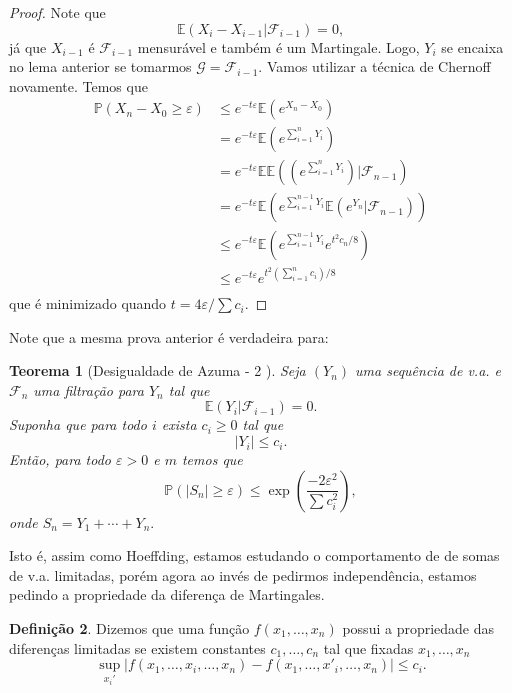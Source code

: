 \documentclass[12pt,a4paper,oneside]{book}
\newtheorem{theorem}{Teorema}[section]
\theoremstyle{definition}
\newtheorem{definition}[theorem]{Defini\c{c}\~ao}
\theoremstyle{remark}
\numberwithin{equation}{section}
\newcommand{\e}{\varepsilon}
\newcommand{\E}{\mathbb{E}}
\newcommand{\pr}{\mathbb{P}}
\newcommand{\ds}{\displaystyle}
\begin{document}
\begin{proof}
Note que 
$$\E(X_i-X_{i-1}|\mathcal{F}_{i-1}) = 0, $$ já que $X_{i-1}$ é $\mathcal{F}_{i-1}$ mensurável e também é um Martingale. Logo, $Y_i$ se encaixa no lema anterior se tomarmos $\mathcal{G} =\mathcal{F}_{i-1}. $
Vamos utilizar a técnica de Chernoff novamente. Temos que
\begin{align*}
\pr(X_n-X_0\geq \e) &\leq e^{-t\e}\E(e^{X_n-X_0})\\
 &= e^{-t\e}\E(e^{\sum_{i=1}^n Y_i})\\
 &=e^{-t\e}\E\E((e^{\sum_{i=1}^n Y_i})|\mathcal{F}_{n-1})\\
  &=e^{-t\e}\E( e^{\sum_{i=1}^{n-1} Y_i}\E(e^{Y_n}|\mathcal{F}_{n-1}))\\
  &\leq e^{-t\e}\E( e^{\sum_{i=1}^{n-1} Y_i}e^{t^2 c_n/8
  })\\
 &\leq e^{-t\e} e^{t^2 (\sum_{i=1}^{n}c_i)/8}\\
\end{align*}
que é minimizado quando $t=4\e/\sum c_i.$

\end{proof}
\begin{tcolorbox}
Note que a mesma prova anterior é verdadeira para:
\begin{theorem}[Desigualdade de Azuma - 2 ]Seja $(Y_n)$ uma sequência de v.a. e $\mathcal{F}_n$ uma filtração para $Y_n$  tal que 
$$\E(Y_i|\mathcal{F}_{i-1})=0.$$
Suponha que para todo $i$ exista $c_i\geq 0$ tal que
$$|Y_i|\leq c_i. $$
Então, para todo $\e>0$ e $m$ temos que
$$\pr\left(\ds |S_n| \geq \e \right) \leq \exp \left(\dfrac{-2\e^2}{\sum c_i^2} \right),  $$
onde 
$S_n = Y_1+\cdots+Y_n. $ 
\end{theorem}

Isto é, assim como Hoeffding, estamos estudando o comportamento de de somas de v.a. limitadas, porém agora ao invés de pedirmos independência, estamos pedindo a propriedade da diferença de Martingales.

\end{tcolorbox}




\begin{definition}\label{def-diferencaslimitadas}
Dizemos que uma função $f(x_1,\dots,x_n)$ possui a propriedade das diferenças limitadas se existem constantes $c_1,\dots,c_n$ tal que fixadas $x_1,\dots,x_n$
$$\sup_{x_i'} |f(x_1,\dots,x_i,\dots,x_n) -f(x_1,\dots,x'_i,\dots,x_n) | \leq c_i.$$

\end{definition}
\end{document}
